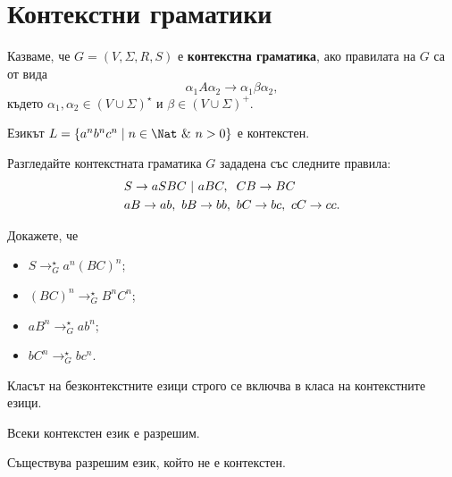 \section{Контекстни граматики}

Казваме, че $G = (V,\Sigma,R,S)$ е {\bf контекстна граматика}, ако правилата на $G$ са от вида
\[\alpha_1 A \alpha_2 \to \alpha_1 \beta \alpha_2,\]
където $\alpha_1,\alpha_2 \in (V\cup\Sigma)^\star$ и $\beta \in (V\cup\Sigma)^+$.

\begin{problem}
  Езикът $L = \{a^nb^nc^n \mid n \in \Nat\ \&\ n > 0\}$ е контекстен.
\end{problem}
\begin{hint}
  Разгледайте контекстната граматика $G$ зададена със следните правила:
  \begin{align*}
    & S \to aSBC\ |\ aBC,\hspace*{0.2cm} CB \to BC\\
    & aB \to ab,\ bB \to bb,\ bC \to bc,\ cC \to cc.
  \end{align*}

  Докажете, че
  \begin{itemize}
  \item
    $S \to^\star_Ga^n(BC)^n$;
  \item
    $(BC)^n \to^\star_G B^nC^n$;
  \item
    $aB^n \to^\star_G ab^n$;
  \item
    $bC^n \to^\star_G bc^n$.
  \end{itemize}
\end{hint}

\begin{prop}
  Класът на безконтекстните езици строго се включва в класа на контекстните езици.
\end{prop}

\begin{prop}
  Всеки контекстен език е разрешим.
\end{prop}

\begin{prop}
  Съществува разрешим език, който не е контекстен.
\end{prop}


